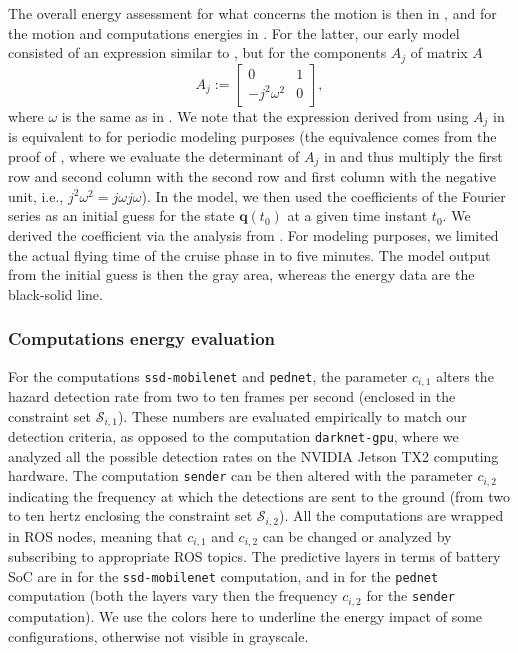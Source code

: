 The overall energy assessment for what concerns the motion is then in , and for the motion and computations energies in . For the latter, our early model consisted of an expression similar to , but for the components $A_j$ of matrix $A$
\begin{equation}\label{eq:alter-aj}
  A_j:=\begin{bmatrix}0 & 1 \\ -j^2\omega^2 & 0\end{bmatrix},
\end{equation}
where $\omega$ is the same as in . We note that the expression derived from using $A_j$ in  is equivalent to  for periodic modeling purposes (the equivalence comes from the proof of , where we evaluate the determinant of $A_j$ in  and thus multiply the first row and second column with the second row and first column with the negative unit, i.e., $j^2\omega^2=j\omega j\omega$). In the model, we then used the coefficients of the Fourier series as an initial guess for the state $\mathbf{q}(t_0)$ at a given time instant $t_0$. We derived the coefficient via the analysis from . For modeling purposes, we limited the actual flying time of the cruise phase in  to five minutes. The model output from the initial guess is then the gray area, whereas the energy data are the black-solid line. 

\subsubsection*{Computations energy evaluation}

For the computations {\small\tt ssd-mobilenet} and {\small\tt pednet}, the parameter $c_{i,1}$ alters the hazard detection rate from two to ten frames per second (enclosed in the constraint set $\mathcal{S}_{i,1}$). These numbers are evaluated empirically to match our detection criteria, as opposed to the computation {\small\tt darknet-gpu}, where we analyzed all the possible detection rates on the NVIDIA Jetson TX2 computing hardware. The computation {\small\tt sender} can be then altered with the parameter $c_{i,2}$ indicating the frequency at which the detections are sent to the ground (from two to ten hertz enclosing the constraint set $\mathcal{S}_{i,2}$). All the computations are wrapped in ROS nodes, meaning that $c_{i,1}$ and $c_{i,2}$ can be changed or analyzed by subscribing to appropriate ROS topics. The predictive layers in terms of battery SoC are in  for the {\small\tt ssd-mobilenet} computation, and in  for the {\small\tt pednet} computation (both the layers vary then the frequency $c_{i,2}$ for the {\small\tt sender} computation). We use the colors here to underline the energy impact of some configurations, otherwise not visible in grayscale.


